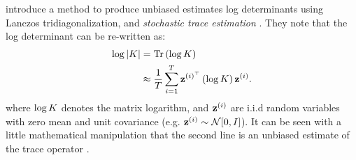 \citet{ubaru2017fast} introduce a method to produce unbiased estimates log determinants using Lanczos tridiagonalization, and \emph{stochastic trace estimation} \cite{hutchinson1990stochastic,avron2011randomized,fitzsimons2016improved}.
They note that the log determinant can be re-written as:
%
\begin{align}
  \log \vert \bK \vert &= \tr{ \log \bK }
  \nonumber \\
  &\approx \frac{1}{T} \sum_{i=1}^T \bz^{(i)^\top} \left( \log \bK \right) \bz^{(i)}.
  \label{eqn:logdet_sta}
\end{align}
%
where $\log K$ denotes the matrix logarithm, and $\mathbf{z}^{(i)}$ are i.i.d random variables with zero mean and unit covariance (e.g. $\bz^{(i)} \sim \normaldist{0}{\bI}$).
It can be seen with a little mathematical manipulation that the second line is an unbiased estimate of the trace operator \cite{hutchinson1990stochastic}.

